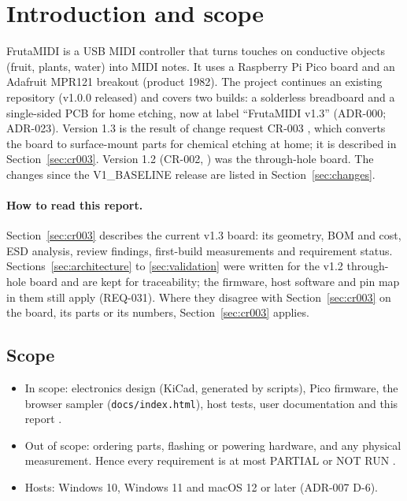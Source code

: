 \section{Introduction and scope}
\label{sec:intro}

FrutaMIDI is a USB MIDI controller that turns touches on conductive objects
(fruit, plants, water) into MIDI notes. It uses a Raspberry Pi Pico board and an
Adafruit MPR121 breakout (product 1982). The project continues an existing
repository (v1.0.0 released) and covers two builds: a solderless breadboard and a
single-sided PCB for home etching, now at label ``FrutaMIDI v1.3''
 (ADR-000; ADR-023). Version 1.3 is the result of change
request CR-003 , which converts the board to surface-mount
parts for chemical etching at home; it is described in Section~\ref{sec:cr003}.
Version 1.2 (CR-002, ) was the through-hole board. The
changes since the V1\_BASELINE release are listed in Section~\ref{sec:changes}.

\paragraph{How to read this report.} Section~\ref{sec:cr003} describes the current
v1.3 board: its geometry, BOM and cost, ESD analysis, review findings, first-build
measurements and requirement status. Sections~\ref{sec:architecture} to
\ref{sec:validation} were written for the v1.2 through-hole board and are kept for
traceability; the firmware, host software and pin map in them still apply
(REQ-031). Where they disagree with Section~\ref{sec:cr003} on the board, its parts
or its numbers, Section~\ref{sec:cr003} applies.

\subsection{Scope}
\begin{itemize}[noitemsep]
  \item In scope: electronics design (KiCad, generated by scripts), Pico firmware,
        the browser sampler (\nolinkurl{docs/index.html}), host tests, user
        documentation and this report .
  \item Out of scope: ordering parts, flashing or powering hardware, and any
        physical measurement. Hence every \lbl{[PHYSICAL]} requirement is at most
        PARTIAL or NOT RUN .
  \item Hosts: Windows 10, Windows 11 and macOS 12 or later (ADR-007 D-6).
\end{itemize}

